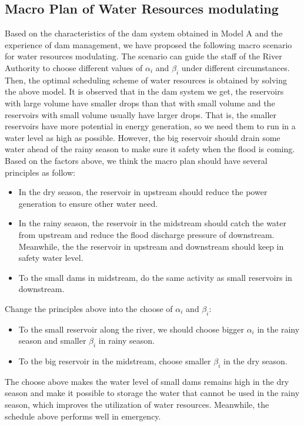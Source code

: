 \documentclass{mcmthesis}
\begin{document}
\subsection{Macro Plan of Water Resources modulating}
Based on the characteristics of the dam system obtained in Model A and the experience of dam management, we have proposed the following macro scenario for water resources modulating. The scenario can guide the staff of the River Authority to choose different values of $\alpha_{i}$ and $\beta_{i}$ under different circumstances. Then, the optimal scheduling scheme of water resources is obtained by solving the above model. It is observed that in the dam system we get, the reservoirs with large volume have smaller drops than that with small volume and the reservoirs with small volume usually have larger drops. That is, the smaller reservoirs have more potential in energy generation, so we need them to run in a water level as high as possible. However, the big reservoir should drain some water ahead of the rainy season to make sure it safety when the flood is coming. Based on the factors above, we think the macro plan should have several principles as follow:
\begin{itemize}
  \item In the dry season, the reservoir in upstream should reduce the power generation to ensure other water need.
  \item In the rainy season, the reservoir in the midstream should catch the water from upstream and reduce the flood discharge pressure of downstream. Meanwhile, the the reservoir in upstream and downstream should keep in safety water level.
  \item To the small dams in midstream, do the same activity as small reservoirs in downstream.
\end{itemize}
Change the principles above into the choose of $\alpha_{i}$ and $\beta_{i}$:
\begin{itemize}
  \item To the small reservoir along the river, we should choose bigger $\alpha_{i}$ in the rainy season and smaller $\beta_{i}$ in rainy season.
  \item To the big reservoir in the midstream, choose smaller $\beta_{i}$ in the dry season.
\end{itemize}
The choose above makes the water level of small dams remains high in the dry season and make it possible to storage the water that cannot be used in the rainy season, which improves the utilization of water resources. Meanwhile, the schedule above performs well in emergency.
\end{document}

